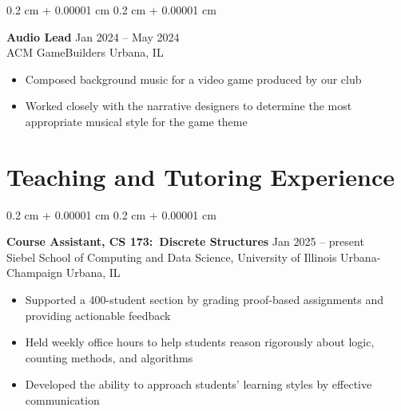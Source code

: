 \documentclass[10pt, letterpaper]{article}
\newenvironment{highlights}{
    \begin{itemize}[
        topsep=0 cm,
        parsep=0 cm,
        partopsep=0pt,
        itemsep=0pt,
        leftmargin=0.4 cm + 10pt
    ]
}{
    \end{itemize}
} %
\newenvironment{onecolentry}{
    \begin{adjustwidth}{
        0.2 cm + 0.00001 cm
    }{
        0.2 cm + 0.00001 cm
    }
}{
    \end{adjustwidth}
} %
\begin{document}
        \begin{onecolentry}
            \textbf{Audio Lead} \hfill Jan 2024 -- May 2024 \\
            ACM GameBuilders \hfill Urbana, IL

            \begin{highlights}
                \item Composed background music for a video game produced by our club
                \item Worked closely with the narrative designers to determine the most appropriate musical style for the game theme
            \end{highlights}
        \end{onecolentry}

        \vspace{0.2cm}

        
    \section{Teaching and Tutoring Experience}
        \begin{onecolentry}
            \textbf{Course Assistant, CS 173:~Discrete Structures} \hfill Jan 2025 -- present \\
            Siebel School of Computing and Data Science, University of Illinois Urbana-Champaign \hfill Urbana, IL
            
            \begin{highlights}
                \item Supported a 400-student section by grading proof-based assignments and providing actionable feedback
                \item Held weekly office hours to help students reason rigorously about logic, counting methods, and algorithms
                \item Developed the ability to approach students' learning styles by effective communication
            \end{highlights}
        \end{onecolentry}

        \vspace{0.2cm}
        
\end{document}

